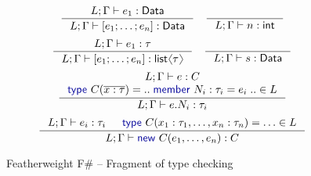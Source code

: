 \documentclass[10pt,preprint,blind,clearpagebib]{sigplanconf}
\newcommand{\langl}{\begin{picture}(4.5,7)
\put(1.1,2.5){\rotatebox{60}{\line(1,0){5.5}}}
\put(1.1,2.5){\rotatebox{300}{\line(1,0){5.5}}}
\end{picture}}
\newcommand{\rangl}{\begin{picture}(4.5,7)
\put(.9,2.5){\rotatebox{120}{\line(1,0){5.5}}}
\put(.9,2.5){\rotatebox{240}{\line(1,0){5.5}}}
\end{picture}}
\newcommand{\kvd}[1]{\textnormal{\textcolor{kvdclr}{\sffamily #1}}}
\newcommand{\ident}[1]{\textnormal{\sffamily #1}}
\begin{document}
\begin{figure}
\noindent  
\begin{equation*}
\inference
  {L; \Gamma \vdash e_1 : \ident{Data}}
  {L; \Gamma \vdash [e_1; \ldots; e_n]:\ident{Data}}
\quad  
\inference
  {~}
  {L; \Gamma \vdash n : \ident{int}}
\end{equation*}
\begin{equation*}
\inference
  {L; \Gamma \vdash e_1 : \tau}
  {L; \Gamma \vdash [e_1; \ldots; e_n]:\ident{list}\langl\tau\rangl}
\quad
\inference
  {~}
  {L; \Gamma \vdash s : \ident{Data}}
\end{equation*}
\vspace{0.5em}
\begin{equation*}
\inference
  {L; \Gamma \vdash e : C \\ \kvd{type}~C(\overline{x:\tau}) = ..\;\kvd{member}~N_i : \tau_i = e_i\;.. \in L}
  {L; \Gamma \vdash e.N_i:\tau_i}
\end{equation*}
\vspace{0.25em}
\begin{equation*}
\inference
  {L; \Gamma \vdash e_i : \tau_i & \kvd{type}~C(x_1:\tau_1, \ldots, x_n:\tau_n) = \ldots \in L}
  {L; \Gamma \vdash \kvd{new}~C(e_1, \ldots, e_n):C}
\end{equation*}

\caption{Featherweight F\# -- Fragment of type checking}
\label{fig:ff-typecheck}
\end{figure}

\end{document}
